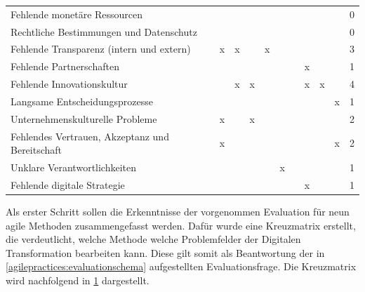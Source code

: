 \begin{table}
\begin{tabular}{|p{7cm}|c|c|c|c|c|c|c|c|c|c|}
		Fehlende monetäre Ressourcen                    &       &                 &        &        &    &      &                        &     &                   & 0 \\
		Rechtliche Bestimmungen und Datenschutz         &       &                 &        &        &    &      &                        &     &                   & 0 \\
		Fehlende Transparenz (intern und extern)        & x     & x               &        & x      &    &      &                        &     &                   & 3 \\
		Fehlende Partnerschaften                        &       &                 &        &        &    &      & x                      &     &                   & 1 \\
		Fehlende Innovationskultur                      &       & x               & x      &        &    &      & x                      & x   &                   & 4 \\
		Langsame Entscheidungsprozesse                  &       &                 &        &        &    &      &                        &     & x                 & 1 \\
		Unternehmenskulturelle Probleme                 & x     &                 & x      &        &    &      &                        &     &                   & 2 \\
		Fehlendes Vertrauen, Akzeptanz und Bereitschaft & x     &                 &        &        &    &      &                        &     & x                 & 2 \\
		Unklare Verantwortlichkeiten                    &       &                 &        &        & x  &      &                        &     &                   & 1 \\
		Fehlende digitale Strategie                     &       &                 &        &        &    &      & x                      &     &                   & 1 \\
		\hline
	\end{tabular}
	\label{tab:clusteringfinal}
\end{table}

Als erster Schritt sollen die Erkenntnisse der vorgenommen Evaluation für neun agile Methoden zusammengefasst werden. Dafür wurde eine Kreuzmatrix erstellt, die verdeutlicht, welche Methode welche Problemfelder der  Digitalen Transformation bearbeiten kann. Diese gilt somit als Beantwortung der in \ref{agilepractices:evaluationschema} aufgestellten Evaluationsfrage. Die Kreuzmatrix wird nachfolgend in \ref{tab:clusteringfinal} dargestellt.

